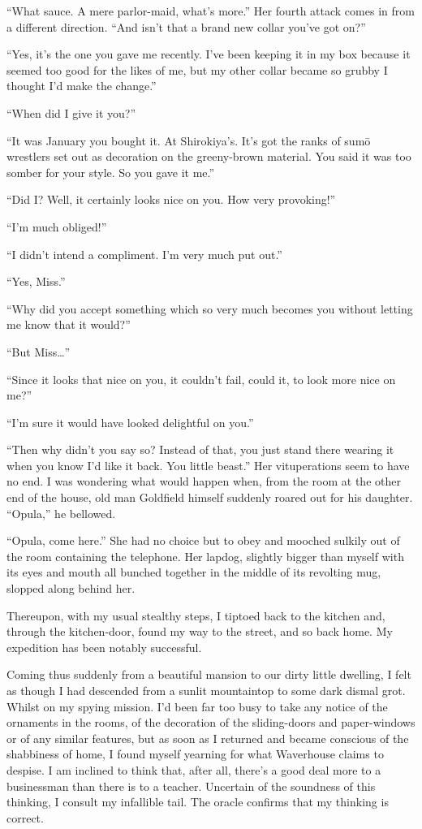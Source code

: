 \documentclass{book}
\begin{document}
``What sauce. A mere parlor-maid, what's more.'' Her fourth attack comes
in from a different direction. ``And isn't that a brand new collar
you've got on?''

``Yes, it's the one you gave me recently. I've been keeping it in my box
because it seemed too good for the likes of me, but my other collar
became so grubby I thought I'd make the change.''

``When did I give it you?''

``It was January you bought it. At Shirokiya's. It's got the ranks of
sumō wrestlers set out as decoration on the greeny-brown material. You
said it was too somber for your style. So you gave it me.''

``Did I? Well, it certainly looks nice on you. How very provoking!''

``I'm much obliged!''

``I didn't intend a compliment. I'm very much put out.''

``Yes, Miss.''

``Why did you accept something which so very much becomes you without
letting me know that it would?''

``But Miss\ldots{}''

``Since it looks that nice on you, it couldn't fail, could it, to look
more nice on me?''

``I'm sure it would have looked delightful on you.''

``Then why didn't you say so? Instead of that, you just stand there
wearing it when you know I'd like it back. You little beast.'' Her
vituperations seem to have no end. I was wondering what would happen
when, from the room at the other end of the house, old man Goldfield
himself suddenly roared out for his daughter. ``Opula,'' he bellowed.

``Opula, come here.'' She had no choice but to obey and mooched sulkily
out of the room containing the telephone. Her lapdog, slightly bigger
than myself with its eyes and mouth all bunched together in the middle
of its revolting mug, slopped along behind her.

Thereupon, with my usual stealthy steps, I tiptoed back to the kitchen
and, through the kitchen-door, found my way to the street, and so back
home. My expedition has been notably successful.

Coming thus suddenly from a beautiful mansion to our dirty little
dwelling, I felt as though I had descended from a sunlit mountaintop to
some dark dismal grot. Whilst on my spying mission. I'd been far too
busy to take any notice of the ornaments in the rooms, of the decoration
of the sliding-doors and paper-windows or of any similar features, but
as soon as I returned and became conscious of the shabbiness of home, I
found myself yearning for what Waverhouse claims to despise. I am
inclined to think that, after all, there's a good deal more to a
businessman than there is to a teacher. Uncertain of the soundness of
this thinking, I consult my infallible tail. The oracle confirms that my
thinking is correct.
\end{document}
